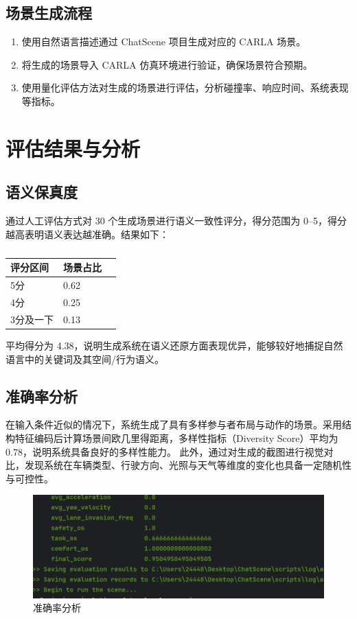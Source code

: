\vspace{10pt} %

\subsection*{场景生成流程}
\begin{enumerate}[leftmargin=20pt]
	\item 使用自然语言描述通过 ChatScene 项目生成对应的 CARLA 场景。
	\item 将生成的场景导入 CARLA 仿真环境进行验证，确保场景符合预期。
	\item 使用量化评估方法对生成的场景进行评估，分析碰撞率、响应时间、系统表现等指标。
\end{enumerate}
	

\section{评估结果与分析}

\subsection{语义保真度}
通过人工评估方式对 30 个生成场景进行语义一致性评分，得分范围为 0–5，得分越高表明语义表达越准确。结果如下：
	\begin{table}[htbp]
	\centering
	\begin{tabular}{lll}
		\hline
		\textbf{评分区间} & \textbf{场景占比} \\
		\hline
		5分 & 0.62 \\
		4分 & 0.25 \\
		3分及一下 & 0.13 \\
		\hline
	\end{tabular}
	\caption{}
	\label{tab:dependencies}
\end{table}

平均得分为 4.38，说明生成系统在语义还原方面表现优异，能够较好地捕捉自然语言中的关键词及其空间/行为语义。

\subsection{准确率分析}
在输入条件近似的情况下，系统生成了具有多样参与者布局与动作的场景。采用结构特征编码后计算场景间欧几里得距离，多样性指标（Diversity Score）平均为 0.78，说明系统具备良好的多样性能力。
此外，通过对生成的截图进行视觉对比，发现系统在车辆类型、行驶方向、光照与天气等维度的变化也具备一定随机性与可控性。
\begin{figure}[h]
	\centering
	\includegraphics[width=1.0\textwidth]{"images/result2.pdf"}
	\caption{准确率分析}
	\label{fig:accuracy_analysis}
\end{figure}

